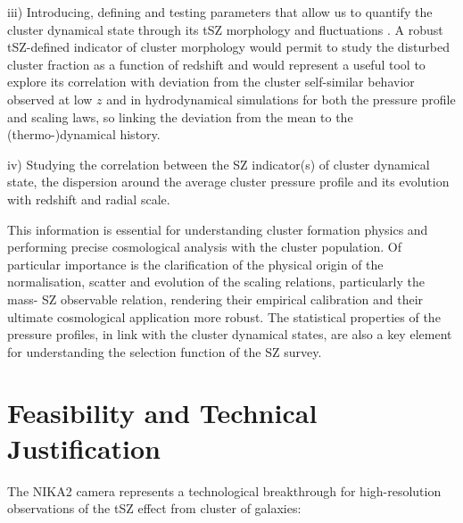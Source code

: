 \documentclass[11pt,a4paper,twoside,graphicx,color]{article}
\newcommand{\laurence}[1]{#1}
\begin{document}
iii) Introducing, defining and testing parameters that allow us to
quantify the cluster dynamical state through its tSZ morphology and fluctuations \cite{Khatri:2016jpa}. A
robust tSZ-defined indicator of cluster morphology would permit to
study the disturbed cluster fraction as a function of redshift and
would represent a useful tool to explore its correlation with
deviation from the cluster self-similar behavior observed at low $z$
and in hydrodynamical simulations for both the pressure profile and scaling laws, 
so linking the deviation from the mean to the (thermo-)dynamical history. 
	
iv) Studying the correlation between the SZ indicator(s) of cluster
dynamical state, the dispersion around the average cluster pressure profile
and its evolution with redshift and radial scale.  

This information is essential for  understanding cluster formation physics and performing precise  cosmological analysis with the cluster population.  Of particular importance is the clarification of  the physical origin of the normalisation, scatter and evolution  of the scaling relations,   particularly the mass- SZ observable relation, rendering their empirical calibration and their ultimate cosmological application more robust. The statistical properties of the pressure profiles, in link with the cluster dynamical states,  are also a key element for understanding the selection function of the SZ survey. 


\section{Feasibility and Technical Justification}
The NIKA2 camera %
\laurence{represents a technological breakthrough} 
for high-resolution observations of the tSZ effect from cluster of
galaxies:
\end{document}
